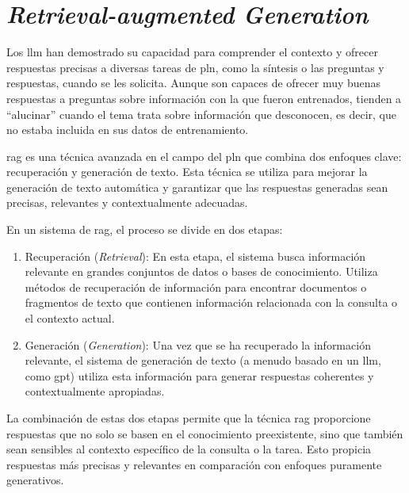\section{\textit{Retrieval-augmented Generation}}

Los \acrshort{llm} han demostrado su capacidad para comprender el contexto y ofrecer respuestas precisas a diversas tareas de \acrlong{pln}, como la síntesis o las preguntas y respuestas, cuando se les solicita. Aunque son capaces de ofrecer muy buenas respuestas a preguntas sobre información con la que fueron entrenados, tienden a ``alucinar'' cuando el tema trata sobre información que desconocen, es decir, que no estaba incluida en sus datos de entrenamiento.

\acrlong{rag} es una técnica avanzada en el campo del \acrshort{pln} que combina dos enfoques clave: recuperación y generación de texto. Esta técnica se utiliza para mejorar la generación de texto automática y garantizar que las respuestas generadas sean precisas, relevantes y contextualmente adecuadas\cite{Lewis2020}.

En un sistema de \acrshort{rag}, el proceso se divide en dos etapas:

\begin{enumerate}
    \item Recuperación (\textit{Retrieval}): En esta etapa, el sistema busca información relevante en grandes conjuntos de datos o bases de conocimiento. Utiliza métodos de recuperación de información para encontrar documentos o fragmentos de texto que contienen información relacionada con la consulta o el contexto actual.

    \item Generación (\textit{Generation}): Una vez que se ha recuperado la información relevante, el sistema de generación de texto (a menudo basado en un \acrshort{llm}, como \acrshort{gpt}) utiliza esta información para generar respuestas coherentes y contextualmente apropiadas.
    
\end{enumerate}


La combinación de estas dos etapas permite que la técnica \acrshort{rag} proporcione respuestas que no solo se basen en el conocimiento preexistente\cite{chen-etal-2017-reading}, sino que también sean sensibles al contexto específico de la consulta o la tarea. Esto propicia respuestas más precisas y relevantes en comparación con enfoques puramente generativos\cite{fan-etal-2019-eli5,hossain-etal-2020-simple}.

